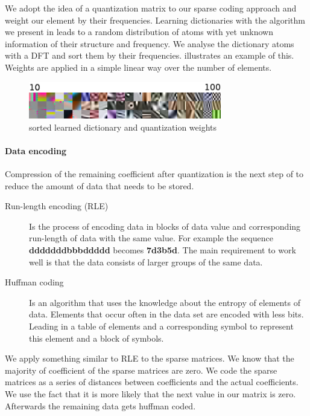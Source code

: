 We adopt the idea of a quantization matrix to our sparse coding approach and
weight our element by their frequencies. Learning dictionaries with the
algorithm we present in  leads to a random distribution of
atoms with yet unknown information of their structure and frequency. We analyse
the dictionary atoms with a DFT and sort them by their frequencies.
 illustrates an example of this. Weights are applied
in a simple linear way over the number of elements.

\begin{figure}[h]
\centering
\includegraphics[width = 0.75\textwidth]{images/sorted.png}
\caption{sorted learned dictionary and quantization weights}
\label{fig:sorted}
\end{figure}

\paragraph{Data encoding}
Compression of the remaining coefficient after quantization is the next step
of to reduce the amount of data that needs to be stored.

\begin{description}
 \item[Run-length encoding (RLE)] Is the process of encoding data in blocks of
data value and corresponding run-length of data with the same value. 
For example the sequence {\bf dddddddbbbddddd} becomes {\bf7d3b5d}.
The main requirement to work well is that the data consists of larger groups of
the same
data.
  \item[Huffman coding] Is an algorithm that uses the knowledge about the
entropy of elements of data. Elements that occur often in the data set are
encoded with less bits. Leading in a table of elements and a corresponding
symbol to represent this element and a block of symbols.
\end{description}

We apply something similar to RLE to the sparse matrices. We know that the
majority of coefficient of the sparse matrices are zero. We code the sparse
matrices as a series of distances between coefficients and the actual
coefficients. We use the fact that it is more likely that the next value in our
matrix is zero. Afterwards the remaining data gets huffman coded.


